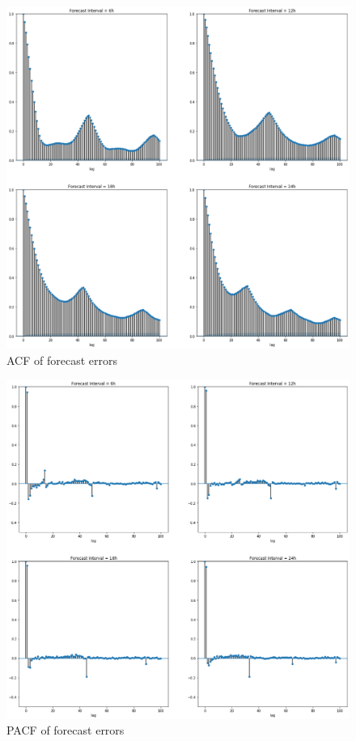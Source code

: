 \documentclass[mstat,12pt]{unswthesis}
\begin{document}
\begin{figure}
\includegraphics[width=1\linewidth,height=0.65\textheight]{images/ACFForecastErrors} \caption{ACF of forecast errors}\label{fig:acfErrors}
\end{figure}

\begin{figure}
\includegraphics[width=1\linewidth,height=0.6\textheight]{images/PACFForecastErrors} \caption{PACF of forecast errors}\label{fig:pacfErrors}
\end{figure}
\end{document}
